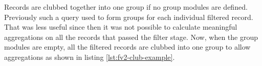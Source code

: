 Records are clubbed together into one group if no group modules are defined.
Previously such a query used to form groups for each individual filtered
record.  That was less
useful since then it was not possible to calculate meaningful aggregations on
all the records that passed the filter stage. Now, when the group modules are
empty, all the filtered records are clubbed into one group to allow
aggregations as shown in listing \ref{lst:fv2-club-example}.
